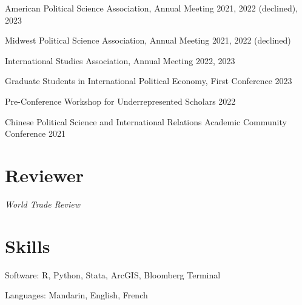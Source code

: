 \documentclass[margin,line]{res}
\begin{document}
\begin{resume}
American Political Science Association, Annual Meeting \hfill{2021, 2022 (declined), 2023}

\vspace*{-3mm}
Midwest Political Science Association, Annual Meeting \hfill{2021, 2022 (declined)}

\vspace*{-3mm}
International Studies Association, Annual Meeting \hfill{2022, 2023}

\vspace*{-3mm}
Graduate Students in International Political Economy, First Conference \hfill{2023}

\vspace*{-3mm}
Pre-Conference Workshop for Underrepresented Scholars \hfill{2022}

\vspace*{-3mm}
Chinese Political Science and International Relations Academic Community Conference \hfill{2021}


\section {\sc Reviewer}

{\em World Trade Review}

\section{\sc Skills} 

Software: R, Python, Stata, ArcGIS, Bloomberg Terminal

\vspace*{-3mm}
Languages: Mandarin, English, French 
\end{resume}
\end{document}
